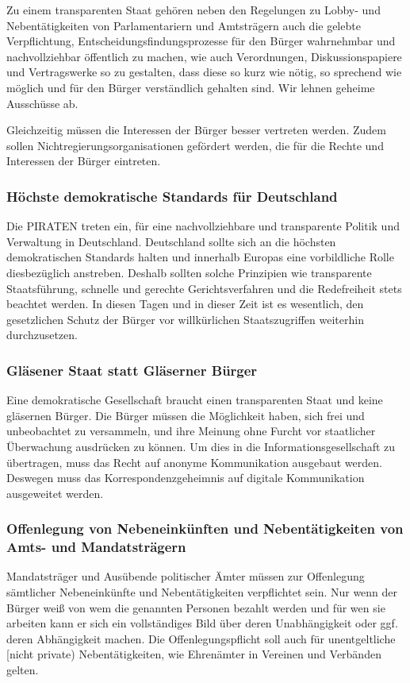 Zu einem transparenten Staat gehören neben den Regelungen zu Lobby- und Nebentätigkeiten von Parlamentariern und Amtsträgern auch die gelebte Verpflichtung, Entscheidungsfindungsprozesse für den Bürger wahrnehmbar und nachvollziehbar öffentlich zu machen, wie auch Verordnungen, Diskussionspapiere und Vertragswerke so zu gestalten, dass diese so kurz wie nötig, so sprechend wie möglich und für den Bürger verständlich gehalten sind. Wir lehnen geheime Ausschüsse ab.

Gleichzeitig müssen die Interessen der Bürger besser vertreten werden. Zudem sollen Nichtregierungsorganisationen gefördert werden, die für die Rechte und Interessen der Bürger eintreten.

\subsubsection{Höchste demokratische Standards für Deutschland}
\abstimmung
Die PIRATEN treten ein, für eine nachvollziehbare und transparente Politik und Verwaltung in Deutschland. Deutschland sollte sich an die höchsten demokratischen Standards halten und innerhalb Europas eine vorbildliche Rolle diesbezüglich anstreben. Deshalb sollten solche Prinzipien wie transparente Staatsführung, schnelle und gerechte Gerichtsverfahren und die Redefreiheit stets beachtet werden. In diesen Tagen und in dieser Zeit ist es wesentlich, den gesetzlichen Schutz der Bürger vor willkürlichen Staatszugriffen weiterhin durchzusetzen.

\subsubsection{Gläsener Staat statt Gläserner Bürger}
\abstimmung
Eine demokratische Gesellschaft braucht einen transparenten Staat und keine gläsernen Bürger. Die Bürger müssen die Möglichkeit haben, sich frei und unbeobachtet zu versammeln, und ihre Meinung ohne Furcht vor staatlicher Überwachung ausdrücken zu können. Um dies in die Informationsgesellschaft zu übertragen, muss das Recht auf anonyme Kommunikation ausgebaut werden. Deswegen muss das Korrespondenzgeheimnis auf digitale Kommunikation ausgeweitet werden.

\subsubsection{Offenlegung von Nebeneinkünften und Nebentätigkeiten von Amts- und Mandatsträgern}
\abstimmung
Mandatsträger und Ausübende politischer Ämter müssen zur Offenlegung sämtlicher Nebeneinkünfte und Nebentätigkeiten verpflichtet sein. Nur wenn der Bürger weiß von wem die genannten Personen bezahlt werden und für wen sie arbeiten kann er sich ein vollständiges Bild über deren Unabhängigkeit oder ggf. deren Abhängigkeit machen. Die Offenlegungspflicht soll auch für unentgeltliche [nicht private) Nebentätigkeiten, wie Ehrenämter in Vereinen und Verbänden gelten.

